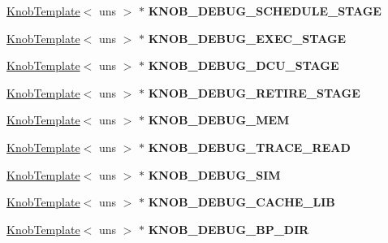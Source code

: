\begin{DoxyCompactItemize}
\item 
\hypertarget{classall__knobs__c_a136a032107c75e27bda6973f82f0e564}{
\hyperlink{classKnobTemplate}{KnobTemplate}$<$ uns $>$ $\ast$ {\bfseries KNOB\_\-DEBUG\_\-SCHEDULE\_\-STAGE}}
\label{classall__knobs__c_a136a032107c75e27bda6973f82f0e564}

\item 
\hypertarget{classall__knobs__c_a71d7a8c4770e0a1d44d1da3c6719a081}{
\hyperlink{classKnobTemplate}{KnobTemplate}$<$ uns $>$ $\ast$ {\bfseries KNOB\_\-DEBUG\_\-EXEC\_\-STAGE}}
\label{classall__knobs__c_a71d7a8c4770e0a1d44d1da3c6719a081}

\item 
\hypertarget{classall__knobs__c_a2397fa0ee8b0447b8fc415935fd756dd}{
\hyperlink{classKnobTemplate}{KnobTemplate}$<$ uns $>$ $\ast$ {\bfseries KNOB\_\-DEBUG\_\-DCU\_\-STAGE}}
\label{classall__knobs__c_a2397fa0ee8b0447b8fc415935fd756dd}

\item 
\hypertarget{classall__knobs__c_aef1c626bb2ad454d4d43a88ae62eac25}{
\hyperlink{classKnobTemplate}{KnobTemplate}$<$ uns $>$ $\ast$ {\bfseries KNOB\_\-DEBUG\_\-RETIRE\_\-STAGE}}
\label{classall__knobs__c_aef1c626bb2ad454d4d43a88ae62eac25}

\item 
\hypertarget{classall__knobs__c_af9c96d9f9438893fc8ca316f9e508b34}{
\hyperlink{classKnobTemplate}{KnobTemplate}$<$ uns $>$ $\ast$ {\bfseries KNOB\_\-DEBUG\_\-MEM}}
\label{classall__knobs__c_af9c96d9f9438893fc8ca316f9e508b34}

\item 
\hypertarget{classall__knobs__c_a65e1c151c12b5cf64e8ff42856a51e8f}{
\hyperlink{classKnobTemplate}{KnobTemplate}$<$ uns $>$ $\ast$ {\bfseries KNOB\_\-DEBUG\_\-TRACE\_\-READ}}
\label{classall__knobs__c_a65e1c151c12b5cf64e8ff42856a51e8f}

\item 
\hypertarget{classall__knobs__c_a115def4b116ac1b8a9d10a569f18db60}{
\hyperlink{classKnobTemplate}{KnobTemplate}$<$ uns $>$ $\ast$ {\bfseries KNOB\_\-DEBUG\_\-SIM}}
\label{classall__knobs__c_a115def4b116ac1b8a9d10a569f18db60}

\item 
\hypertarget{classall__knobs__c_a343930cac2f1f4f134c582a821c29842}{
\hyperlink{classKnobTemplate}{KnobTemplate}$<$ uns $>$ $\ast$ {\bfseries KNOB\_\-DEBUG\_\-CACHE\_\-LIB}}
\label{classall__knobs__c_a343930cac2f1f4f134c582a821c29842}

\item 
\hypertarget{classall__knobs__c_aa2465eca979539b57e0541fb7f8d7950}{
\hyperlink{classKnobTemplate}{KnobTemplate}$<$ uns $>$ $\ast$ {\bfseries KNOB\_\-DEBUG\_\-BP\_\-DIR}}
\label{classall__knobs__c_aa2465eca979539b57e0541fb7f8d7950}


\end{DoxyCompactItemize}
